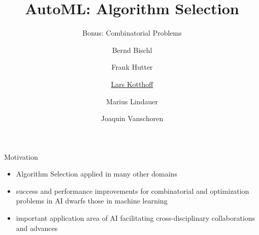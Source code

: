 


\title[AutoML: Overview]{AutoML: Algorithm Selection} %
\subtitle{Bonus: Combinatorial Problems} %
\author[Lars Kotthoff]{Bernd Bischl \and Frank Hutter \and \underline{Lars Kotthoff}\newline \and Marius Lindauer \and Joaquin Vanschoren}
\institute{}
\date{}




	
	\maketitle

\begin{frame}[c]{Motivation}
    \begin{itemize}
        \item Algorithm Selection applied in many other domains
        \item success and performance improvements for combinatorial and
            optimization problems in AI dwarfs those in machine learning
        \item important application area of AI facilitating cross-disciplinary
            collaborations and advances
    \end{itemize}
\end{frame}

